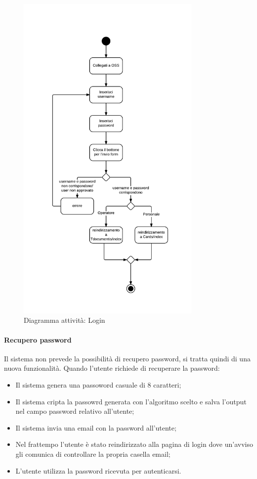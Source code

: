 \begin{figure}[H]
\centering
\includegraphics[width=0.8\textwidth]{images/user_login.png}
\caption{Diagramma attività: Login}
\end{figure}

\paragraph{Recupero password}

Il sistema non prevede la possibilità di recupero password, si tratta quindi di una nuova funzionalità. Quando l'utente richiede di recuperare la password:
\begin{itemize}
\item Il sistema genera una passoword casuale di 8 caratteri;
\item Il sistema cripta la passowrd generata con l'algoritmo scelto e salva l'output nel campo password relativo all'utente;
\item Il sistema invia una email con la password all'utente;
\item Nel frattempo l'utente è stato reindirizzato alla pagina di login dove un'avviso gli comunica di controllare la propria casella email;
\item L'utente utilizza la password ricevuta per autenticarsi.
\end{itemize} 

